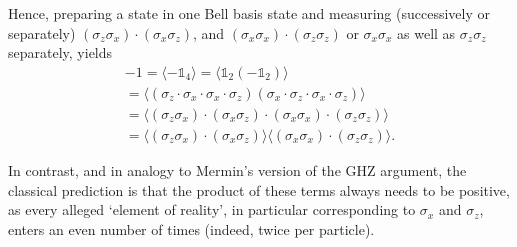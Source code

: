\documentclass[
  twocolumn,
 showpacs,
 showkeys,
 preprintnumbers,
 amsmath,amssymb,
 aps,
 prl,
  longbibliography,
 floatfix,
 ]{revtex4-2}
\newcommand\myotimes{ }
\begin{document}
Hence, preparing a state in one Bell basis state and measuring (successively or separately)
$
(\sigma_z \myotimes \sigma_x) \cdot (\sigma_x \myotimes \sigma_z)
$,
and
$
(\sigma_x \myotimes \sigma_x) \cdot (\sigma_z \myotimes \sigma_z)
$
or
$
\sigma_x \myotimes \sigma_x
$
as well as
$
\sigma_z \myotimes \sigma_z
$ separately,
yields
\begin{equation}
\begin{split}  -1 =
\langle
-\mathbb{1}_4
 \rangle
=
\langle
\mathbb{1}_2 \myotimes (-\mathbb{1}_2)
 \rangle
\\
=
 \langle
(\sigma_z  \cdot \sigma_x \cdot \sigma_x \cdot \sigma_z ) \myotimes (\sigma_x \cdot \sigma_z \cdot  \sigma_x \cdot \sigma_z)
 \rangle
\\
=
\langle
(\sigma_z \myotimes \sigma_x) \cdot (\sigma_x \myotimes \sigma_z)   \cdot
(\sigma_x \myotimes \sigma_x) \cdot (\sigma_z \myotimes \sigma_z)
\rangle
\\
=
\langle
(\sigma_z \myotimes \sigma_x) \cdot (\sigma_x \myotimes \sigma_z)\rangle
\langle  (\sigma_x \myotimes \sigma_x) \cdot (\sigma_z \myotimes \sigma_z) \rangle
.
\end{split}
\end{equation}

In contrast, and in analogy to Mermin's version of the GHZ argument, the classical prediction is that the product of these terms always needs to be positive, as every alleged `element of reality', in particular corresponding to $\sigma_x$ and $\sigma_z$, enters an even number of times (indeed, twice per particle).
\end{document}
